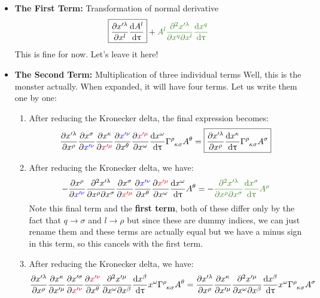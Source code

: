 \begin{itemize}
    \item \textbf{The First Term:} Transformation of normal derivative 
    $$ \boxed{\pdv{x'^\lambda}{x^l} \dv{A^l}{\uptau} }
+ \mathcolor{OliveGreen}{A^l \pdv{x'^\lambda}{x^q}{x^l} \dv{x^q}{\uptau}}$$
This is fine for now. Let's leave it here!
    \item \textbf{The Second Term:} Multiplication of three individual terms
    Well, this is the monster  actually. When expanded, it will have four terms. Let us write them one by one: 
    \begin{enumerate}
        \item After reducing the Kronecker delta, the final expression becomes: \begin{align*} 
            \pdv{x'^\lambda}{x^\rho}\pdv{{x^\sigma}}{\mathcolor{blue}{x'^\nu}} \pdv{{x^\kappa}}{\mathcolor{purple}{x'^\mu}}\pdv{\mathcolor{blue}{x'^\nu}}{x^\theta}\pdv{\mathcolor{purple}{x'^\mu}}{x^\omega}\dv{x^\omega}{\uptau}\tensor{\Gamma}{^\rho _\kappa _\sigma}A^\theta =\boxed{\pdv{x'^\lambda}{x^\rho}\dv{x^\kappa}{\uptau}\tensor{\Gamma}{^\rho _\kappa _\sigma}A^\sigma}
        \end{align*}
        \item After reducing the Kronecker delta, we have:
        \begin{align*}
            - {\pdv{{x^\rho}}{\mathcolor{blue}{x'^\nu}}}{\pdv{x'^\lambda}{x^\rho}{x^\sigma}\pdv{{x^\sigma}}{{\mathcolor{red}{{x'^\mu}}}}}\pdv{\mathcolor{blue}{x'^\nu}}{x^\theta}\pdv{\mathcolor{red}{x'^\mu}}{x^\omega}\dv{x^\omega}{\uptau}A^\theta = -\mathcolor{OliveGreen}{\pdv{x'^\lambda}{x^\rho}{x^\sigma} \dv{x^\sigma}{\uptau}A^\rho}
        \end{align*}
        Note this final term and the \textbf{first term}, both of these differ only by the fact that $q\rightarrow \sigma$ and $l \rightarrow \rho$ but since these are dummy indices, we can just rename them and these terms are actually equal but we have a minus sign in this term, so this cancels with the first term. 
        \item After reducing the Kronecker delta, we have:
        \begin{align*}
            \pdv{x'^\lambda}{x^\rho} \pdv{x^\kappa}{x'^\mu} \pdv{x'^\sigma}{\mathcolor{purple}{x'^\nu}} \pdv{\mathcolor{purple}{x'^\nu}}{x^\theta} \pdv{x'^\mu}{x^\omega}{x^\beta} \dv{x^\beta}{\uptau} x^\omega \tensor{\Gamma}{^\rho_\kappa _\sigma} A^\theta = \pdv{x'^\lambda}{x^\rho} \pdv{x^\kappa}{x'^\mu} \pdv{x'^\mu}{x^\omega}{x^\beta} \dv{x^\beta}{\uptau} x^\omega \tensor{\Gamma}{^\rho_\kappa _\sigma} A^\sigma

\end{align*}
\end{enumerate}
\end{itemize}
